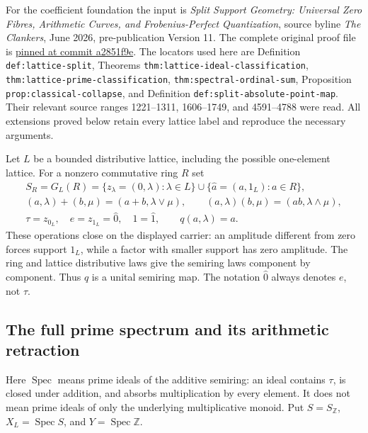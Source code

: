 For the coefficient foundation the input is \emph{Split Support
Geometry: Universal Zero Fibres, Arithmetic Curves, and Frobenius-Perfect
Quantization}, source byline \emph{The Clankers}, June 2026,
pre-publication Version 11. The complete original proof file is
\href{https://github.com/KokunoYumeto/zeta-function-research-reader/blob/a2851f9eb352e7e4376bc629de86fa4ed9c1c434/workbenches/splitzero-tandem/foundations/split-support-geometry-v11/split_support_geometry_arithmetic_curve_v11.tex}{pinned at commit a2851f9e}.
The locators used here are Definition \texttt{def:\allowbreak lattice-\allowbreak split},
Theorems \texttt{thm:\allowbreak lattice-\allowbreak ideal-\allowbreak classification},
\texttt{thm:\allowbreak lattice-\allowbreak prime-\allowbreak classification},
\texttt{thm:\allowbreak spectral-\allowbreak ordinal-\allowbreak sum}, Proposition
\texttt{prop:\allowbreak classical-\allowbreak collapse}, and Definition
\texttt{def:\allowbreak split-\allowbreak absolute-\allowbreak point-\allowbreak map}. Their relevant source ranges
1221--1311, 1606--1749, and 4591--4788 were read. All extensions proved
below retain every lattice label and reproduce the necessary arguments.

Let $L$ be a bounded distributive lattice, including the possible
one-element lattice. For a nonzero commutative ring $R$ set
\begin{equation}\tag{ACF3}
 \begin{gathered}
 S_R=G_L(R)=\{z_\lambda=(0,\lambda):\lambda\in L\}
       \cup\{\widehat a=(a,1_L):a\in R\},\\
 (a,\lambda)+(b,\mu)=(a+b,\lambda\vee\mu),\qquad
 (a,\lambda)(b,\mu)=(ab,\lambda\wedge\mu),\\
 \tau=z_{0_L},\quad e=z_{1_L}=\widehat0,\quad
 1=\widehat1,\qquad q(a,\lambda)=a.
 \end{gathered}
\end{equation}
These operations close on the displayed carrier: an amplitude different
from zero forces support $1_L$, while a factor with smaller support has
zero amplitude. The ring and lattice distributive laws give the semiring
laws component by component. Thus $q$ is a unital semiring map. The
notation $\widehat0$ always denotes $e$, not $\tau$.

\subsection{The full prime spectrum and its arithmetic retraction}
Here $\operatorname{Spec}$ means prime ideals of the additive semiring:
an ideal contains $\tau$, is closed under addition, and absorbs
multiplication by every element. It does not mean prime ideals of only
the underlying multiplicative monoid. Put $S=S_{\mathbb Z}$,
$X_L=\operatorname{Spec}S$, and $Y=\operatorname{Spec}\mathbb Z$.


